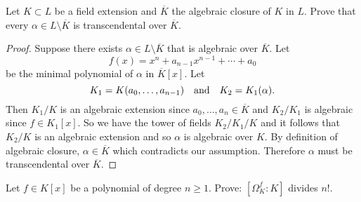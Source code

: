     \begin{ex}{21.32}
        Let $K\subset L$ be a field extension and $\overline{K}$ the algebraic closure of $K$ in $L$. 
        Prove that every $\alpha\in L\setminus\overline{K}$ is transcendental over $\overline{K}$.
    \end{ex}
    \begin{proof}
        Suppose there exists $\alpha\in L\setminus\overline{K}$ that is algebraic over $\overline{K}$.
        Let
        $$f(x)=x^n+a_{n-1}x^{n-1}+\cdots+a_0$$
        be the minimal polynomial of $\alpha$ in $\overline{K}[x]$. Let 
        $$K_1=K(a_0,\dots,a_{n-1})\quad\text{and}\quad K_2=K_1(\alpha).$$
        Then $K_1/K$ is an algebraic extension since $a_0,\dots,a_n\in\overline{K}$ and $K_2/K_1$ is algebraic since $f\in K_1[x]$.
        So we have the tower of fields $K_2/K_1/K$  and it follows that $K_2/K$ is an algebraic extension and so $\alpha$ is algebraic over $K$.
        By definition of algebraic closure, $\alpha\in\overline{K}$ which contradicts our assumption. 
        Therefore $\alpha$ must be transcendental over $\overline{K}$.
    \end{proof}

    \begin{ex}{21.35}
        Let $f\in K[x]$ be a polynomial of degree $n\geq 1$. Prove: $\left[\Omega_K^f:K\right]$ divides $n!$. 
    \end{ex}


